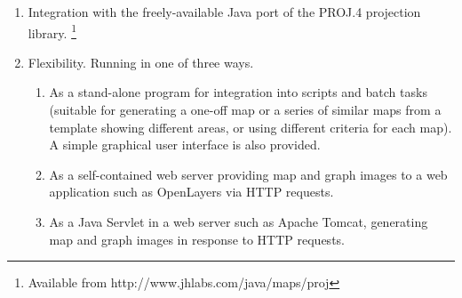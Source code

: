 \begin{enumerate}
\item
Integration with the freely-available
Java port of the PROJ.4 projection library.
\footnote{Available from http://www.jhlabs.com/java/maps/proj}

\item
Flexibility.  Running in one of three ways.

\begin{enumerate}
\item
As a stand-alone program for integration into
scripts and batch tasks (suitable for generating a one-off
map or a series of similar maps from a template
showing different areas, or using different criteria for each map).
A simple graphical user interface is also provided.

\item
As a self-contained web server providing map and
graph images to a web application such as OpenLayers via HTTP requests.

\item
As a Java Servlet in a web server such as Apache Tomcat,
generating map and graph images in response to HTTP requests.

\end{enumerate}

\end{enumerate}

